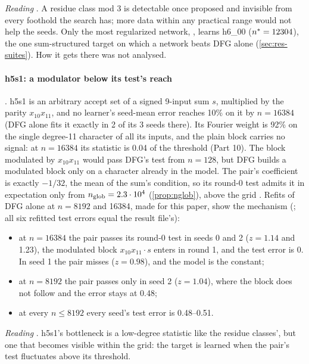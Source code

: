 \emph{Reading} . A residue class mod 3 is detectable once proposed and invisible from every foothold the search has; more data within any practical range would not help the seeds. Only the most regularized network, , learns h6\_00 ($n^{*}=12304$), the one sum-structured target on which a network beats DFG alone (\cref{sec:res-suites}). How it gets there was not analysed.

\paragraph{h5s1: a modulator below its test's reach} . h5s1 is an arbitrary accept set of a signed 9-input sum $s$, multiplied by the parity $x_{10}x_{11}$, and no learner's seed-mean error reaches 10\% on it by $n=16384$ (DFG alone fits it exactly in 2 of its 3 seeds there). Its Fourier weight is 92\% on the single degree-11 character of all its inputs, and the plain block carries no signal: at $n=16384$ its statistic is 0.04 of the threshold (Part 10). The block modulated by $x_{10}x_{11}$ would pass DFG's test from $n=128$, but DFG builds a modulated block only on a character already in the model. The pair's coefficient is exactly $-1/32$, the mean of the sum's condition, so its round-0 test admits it in expectation only from $n_{\rm glob}=2.3\cdot10^4$ (\cref{prop:nglob}), above the grid . Refits of DFG alone at $n=8192$ and 16384, made for this paper, show the mechanism (; all six refitted test errors equal the result file's):
\begin{itemize}
\item at $n=16384$ the pair passes its round-0 test in seeds 0 and 2 ($z=1.14$ and 1.23), the modulated block $x_{10}x_{11}\cdot s$ enters in round 1, and the test error is 0. In seed 1 the pair misses ($z=0.98$), and the model is the constant;
\item at $n=8192$ the pair passes only in seed 2 ($z=1.04$), where the block does not follow and the error stays at 0.48;
\item at every $n\le8192$ every seed's test error is 0.48--0.51.
\end{itemize}
\emph{Reading} . h5s1's bottleneck is a low-degree statistic like the residue classes', but one that becomes visible within the grid: the target is learned when the pair's test fluctuates above its threshold.

